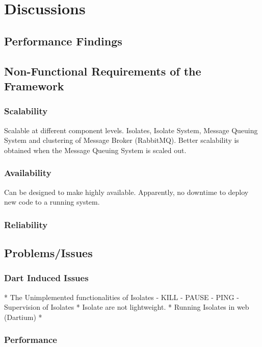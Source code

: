 \chapter{Discussions}\label{chapter:discussions}

\section{Performance Findings}

\section{Non-Functional Requirements of the Framework}

\subsection{Scalability}
Scalable at different component levels. Isolates, Isolate System, Message Queuing System and clustering of Message Broker (RabbitMQ). Better scalability is obtained when the Message Queuing System is scaled out.

\subsection{Availability}
Can be designed to make highly available. Apparently, no downtime to deploy new code to a running system.

\subsection{Reliability}

\section{Problems/Issues}
\subsection{Dart Induced Issues}
  * The Unimplemented functionalities of Isolates
    - KILL
    - PAUSE
    - PING
    - Supervision of Isolates
  * Isolate are not lightweight.
  * Running Isolates in web (Dartium)
  *

\subsection{Performance}
